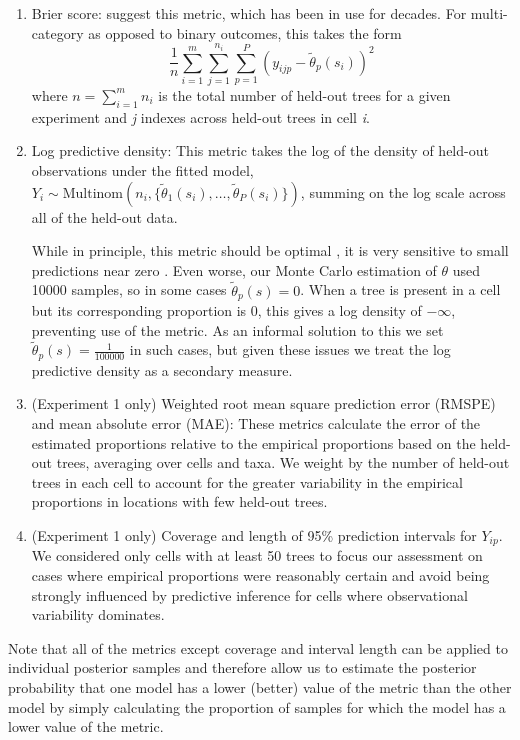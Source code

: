\documentclass[10pt,letterpaper]{article}
\begin{document}
\begin{enumerate}
\item Brier score: \cite{Gnei:etal:2007} suggest this metric, which has
been in use for decades. For multi-category as opposed to binary outcomes,
this takes the form
\[
\frac{1}{n}\sum_{i=1}^{m}\sum_{j=1}^{n_{i}}\sum_{p=1}^{P}(y_{ijp}-\tilde{\theta}_{p}(s_{i}))^{2}
\]
where $n=\sum_{i=1}^{m}n_{i}$ is the total number of held-out trees
for a given experiment and \emph{j} indexes across held-out trees in cell
\emph{i}. 
\item Log predictive density: This metric takes the log of the density of
held-out observations under the fitted model, $Y_{i}\sim\mbox{Multinom}(n_{i},\{\tilde{\theta}_{1}(s_{i}),\ldots,\tilde{\theta}_{P}(s_{i})\})$,
summing on the log scale across all of the held-out data. 


While in principle, this metric should be optimal \cite{Krnj:Drap:2014},
it is very sensitive to small predictions near zero \cite{Gnei:etal:2007}.
Even worse, our Monte Carlo estimation of $\theta$ used 10000 samples,
so in some cases $\tilde{\theta}_{p}(s)=0$. When a tree is present
in a cell but its corresponding proportion is 0, this gives a log
density of $-\infty$, preventing use of the metric. As an informal
solution to this we set $\tilde{\theta}_{p}(s)=\frac{1}{100000}$
in such cases, but given these issues we treat the log predictive
density as a secondary measure.

\item (Experiment 1 only) Weighted root mean square prediction error (RMSPE)
and mean absolute error (MAE): These metrics calculate the error of
the estimated proportions relative to the empirical proportions based
on the held-out trees, averaging over cells and taxa. We weight by
the number of held-out trees in each cell to account for the greater
variability in the empirical proportions in locations with few held-out
trees. 
\item (Experiment 1 only) Coverage and length of 95\% prediction intervals
for $Y_{ip}$. We considered only cells with at least 50 trees to
focus our assessment on cases where empirical proportions were reasonably
certain and avoid being strongly influenced by predictive inference
for cells where observational variability dominates.
\end{enumerate}
Note that all of the metrics except coverage and interval length can
be applied to individual posterior samples and therefore allow us
to estimate the posterior probability that one model has a lower (better)
value of the metric than the other model by simply calculating the
proportion of samples for which the model has a lower value of the
metric.
\end{document}
